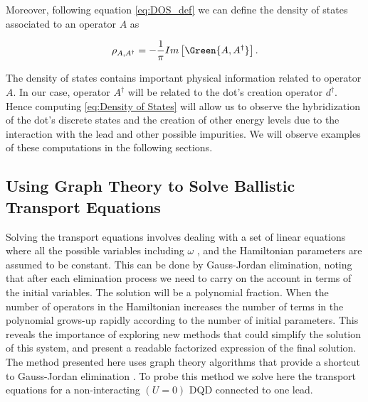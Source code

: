 Moreover, following equation \ref{eq:DOS_def} we can define the density of states associated to an operator $A$ as

\begin{equation}
    \rho_{A,A^\dagger}=-\frac{1}{\pi}Im\left[\Green{A,A^\dagger}\right].
    \label{eq:Density of States}
\end{equation}

\noindent The density of states contains important physical information related to operator $A$. In our case, operator $A^\dagger$ will be related to the dot's creation operator  $d^\dagger$. Hence computing \ref{eq:Density of States} will allow us to observe the hybridization of the dot's discrete states and the creation of other energy levels due to the interaction with the lead and other possible impurities. We will observe examples of these computations in the following sections.


\subsection{Using Graph Theory to Solve Ballistic Transport Equations \label{sec:GraphMethod}}


Solving the transport equations involves dealing with a set of linear equations where all the possible variables including  $\omega$ , and the Hamiltonian parameters are assumed to be constant.  This can be done by  Gauss-Jordan elimination, noting that after each elimination process we need to carry on the account in terms of the initial  variables. The solution  will be a polynomial fraction.  When the number of operators in the Hamiltonian increases the number of terms in the polynomial grows-up rapidly according to the number of initial parameters. This reveals the importance of exploring new methods that could simplify the solution of this system, and present a readable factorized expression of the final solution.   \\

The method presented here uses graph theory algorithms that provide a shortcut to Gauss-Jordan elimination \cite{spielman10}. To probe this method we solve here the transport equations for a non-interacting $(U=0)$ DQD connected to one lead. 

